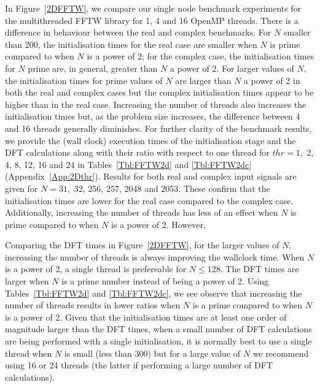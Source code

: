 \documentclass[a4paper]{article}
\begin{document}
In Figure~\ref{2DFFTW}, we compare our single node benchmark
experiments for the multithreaded FFTW library for 1, 4 and 16 OpenMP
threads. There is a difference in behaviour between the real and
complex benchmarks. For $N$ smaller than 200, the initialisation times
for the real case are smaller when $N$ is prime compared to when $N$
is a power of 2; for the complex case, the initialisation times for
$N$ prime are, in general, greater than $N$ a power of 2. For larger
values of $N,$ the initialisation times for prime values of $N$ are
larger than $N$ a power of 2 in both the real and complex cases but
the complex initialisation times appear to be higher than in the real
case. Increasing the number of threads also increases the
initialisation times but, as the problem size increases, the
difference between 4 and 16 threads generally diminishes. For further
clarity of the benchmark results, we provide the (wall clock)
execution times of the initialisation stage and the DFT calculations
along with their ratio with respect to one thread for $thr=1,$ 2, 4,
8, 12, 16 and 24 in Tables~\ref{Tbl:FFTW2d} and
\ref{Tbl:FFTW2dc} (Appendix~\ref{App:2Dthr}). Results for both real and complex input signals are
given for $N=31,$ 32, 256, 257, 2048 and 2053. These confirm that the
initialisation times are lower for the real case compared to the
complex case. Additionally, increasing the number of threads has less
of an effect when $N$ is prime compared to when $N$ is a power of
2. However,

Comparing the DFT times in Figure~\ref{2DFFTW}, for the larger values
of $N,$ increasing the number of threads is always improving the
wallclock time. When $N$ is a power of 2, a single thread is
prefereable for $N\le 128.$ The DFT times are larger when $N$ is a
prime number instead of being a power of 2. Using
Tables~\ref{Tbl:FFTW2d} and \ref{Tbl:FFTW2dc}, we see observe that
increasing the number of threads results in lower ratios when $N$ is a
prime compared to when $N$ is a power of 2. Given that the
initialisation times are at least one order of magnitude larger than
the DFT times, when a small number of DFT calculations are being
performed with a single initialisation, it is normally best to use a
single thread when $N$ is small (less than 300) but for a large value
of $N$ we recommend using 16 or 24 threads (the latter if performing a
large number of DFT calculations).
\end{document}
